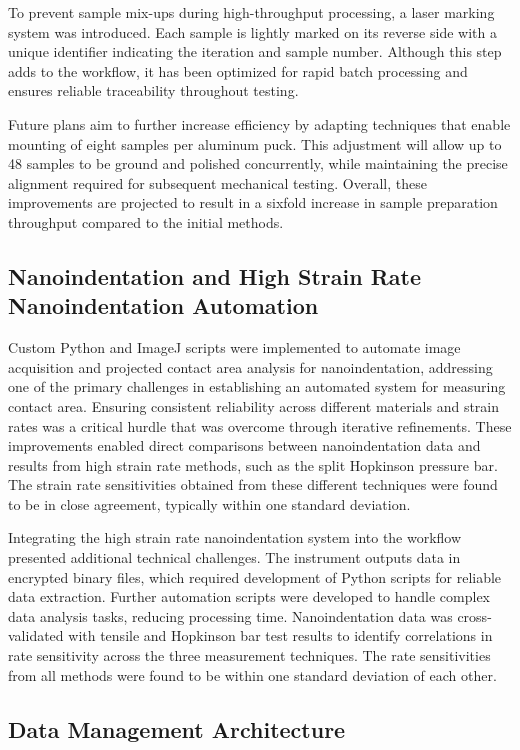 \documentclass[final,5p,times,twocolumn]{elsarticle}
\begin{document}
To prevent sample mix-ups during high-throughput processing, a laser marking system was introduced. Each sample is lightly marked on its reverse side with a unique identifier indicating the iteration and sample number. Although this step adds to the workflow, it has been optimized for rapid batch processing and ensures reliable traceability throughout testing.

Future plans aim to further increase efficiency by adapting techniques that enable mounting of eight samples per aluminum puck. This adjustment will allow up to 48 samples to be ground and polished concurrently, while maintaining the precise alignment required for subsequent mechanical testing. Overall, these improvements are projected to result in a sixfold increase in sample preparation throughput compared to the initial methods.

\subsection{Nanoindentation and High Strain Rate Nanoindentation Automation}

Custom Python and ImageJ scripts were implemented to automate image acquisition and projected contact area analysis for nanoindentation, addressing one of the primary challenges in establishing an automated system for measuring contact area. Ensuring consistent reliability across different materials and strain rates was a critical hurdle that was overcome through iterative refinements. These improvements enabled direct comparisons between nanoindentation data and results from high strain rate methods, such as the split Hopkinson pressure bar. The strain rate sensitivities obtained from these different techniques were found to be in close agreement, typically within one standard deviation.

Integrating the high strain rate nanoindentation system into the workflow presented additional technical challenges. The instrument outputs data in encrypted binary files, which required development of Python scripts for reliable data extraction. Further automation scripts were developed to handle complex data analysis tasks, reducing processing time. Nanoindentation data was cross-validated with tensile and Hopkinson bar test results to identify correlations in rate sensitivity across the three measurement techniques. The rate sensitivities from all methods were found to be within one standard deviation of each other.

\subsection{Data Management Architecture}
\end{document}
